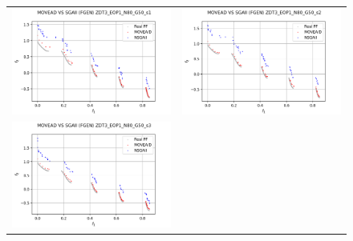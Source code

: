 \begin{figure}[H]
    \centering
    \begin{tabular}{c c}
    \includegraphics[scale=0.5]{figures/ZDT3_EOP1_N80_G50_T12/s1_comp.png} &
    \includegraphics[scale=0.5]{figures/ZDT3_EOP1_N80_G50_T12/s2_comp.png}\\
    \includegraphics[scale=0.5]{figures/ZDT3_EOP1_N80_G50_T12/s3_comp.png} &

\end{tabular}
\end{figure}
